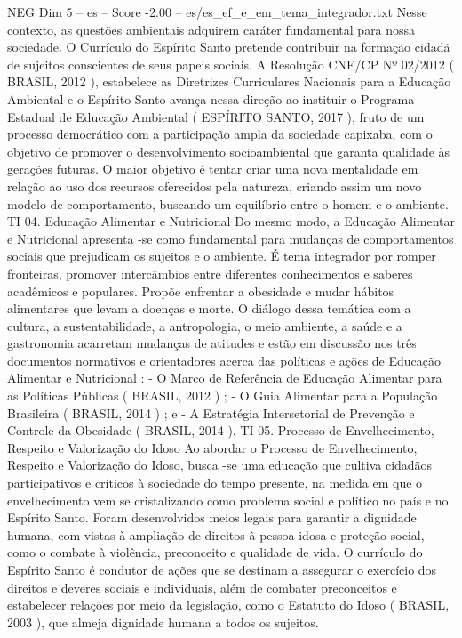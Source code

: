 \begin{textsample}{NEG Dim 5 – es – Score -2.00 – es/es\_ef\_e\_em\_tema\_integrador.txt}
Nesse contexto, as questões ambientais adquirem caráter fundamental para nossa sociedade.
O Currículo do Espírito Santo pretende contribuir na formação cidadã de sujeitos conscientes de seus papeis sociais.
A Resolução CNE/CP Nº 02/2012 ( BRASIL, 2012 ), estabelece as Diretrizes Curriculares Nacionais para a Educação Ambiental e o Espírito Santo avança nessa direção ao instituir o Programa Estadual de Educação Ambiental ( ESPÍRITO SANTO, 2017 ), fruto de um processo democrático com a participação ampla da sociedade capixaba, com o objetivo de promover o desenvolvimento socioambiental que garanta qualidade às gerações futuras.
O maior objetivo é tentar criar uma nova mentalidade em relação ao uso dos recursos oferecidos pela natureza, criando assim um novo modelo de comportamento, buscando um equilíbrio entre o homem e o ambiente.
TI 04.
Educação Alimentar e Nutricional Do mesmo modo, a Educação Alimentar e Nutricional apresenta -se como fundamental para mudanças de comportamentos sociais que prejudicam os sujeitos e o ambiente.
É tema integrador por romper fronteiras, promover intercâmbios entre diferentes conhecimentos e saberes acadêmicos e populares.
Propõe enfrentar a obesidade e mudar hábitos alimentares que levam a doenças e morte.
O diálogo dessa temática com a cultura, a sustentabilidade, a antropologia, o meio ambiente, a saúde e a gastronomia acarretam mudanças de atitudes e estão em discussão nos três documentos normativos e orientadores acerca das políticas e ações de Educação Alimentar e Nutricional : - O Marco de Referência de Educação Alimentar para as Políticas Públicas ( BRASIL, 2012 ) ; - O Guia Alimentar para a População Brasileira ( BRASIL, 2014 ) ; e - A Estratégia Intersetorial de Prevenção e Controle da Obesidade ( BRASIL, 2014 ).
TI 05.
Processo de Envelhecimento, Respeito e Valorização do Idoso Ao abordar o Processo de Envelhecimento, Respeito e Valorização do Idoso, busca -se uma educação que cultiva cidadãos participativos e críticos à sociedade do tempo presente, na medida em que o envelhecimento vem se cristalizando como problema social e político no país e no Espírito Santo.
Foram desenvolvidos meios legais para garantir a dignidade humana, com vistas à ampliação de direitos à pessoa idosa e proteção social, como o combate à violência, preconceito e qualidade de vida.
O currículo do Espírito Santo é condutor de ações que se destinam a assegurar o exercício dos direitos e deveres sociais e individuais, além de combater preconceitos e estabelecer relações por meio da legislação, como o Estatuto do Idoso ( BRASIL, 2003 ), que almeja dignidade humana a todos os sujeitos.

\end{textsample}
